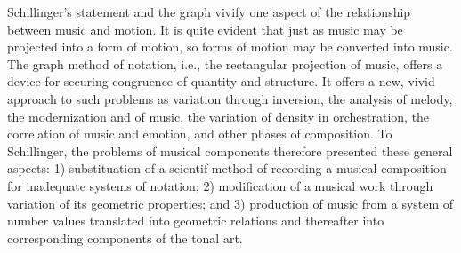 Schillinger's statement and the graph vivify one aspect of the relationship between music and motion. It is quite evident that just as music may be projected into a form of motion, so forms of motion may be converted into music. The graph method of notation, i.e., the rectangular projection of music, offers a device for securing congruence of quantity and structure. It offers a new, vivid approach to such problems as variation through inversion, the analysis of melody, the modernization and  of music, the variation of density in orchestration, the correlation of music and emotion, and other phases of composition. To Schillinger, the problems of musical components therefore presented these general aspects: 1) substituation of a scientif method of recording a musical composition for inadequate systems of notation; 2) modification of a musical work through variation of its geometric properties; and 3) production of music from a system of number values translated into geometric relations and thereafter into corresponding components of the tonal art.

